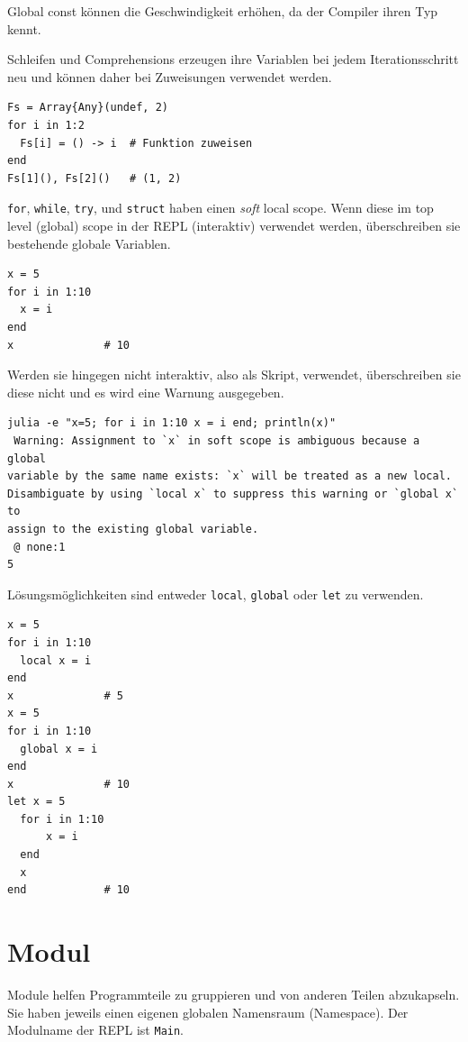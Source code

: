\documentclass[10pt,twocolumn]{scrartcl}
\begin{document}
Global const können die Geschwindigkeit erhöhen, da der Compiler ihren Typ
kennt.

Schleifen und Comprehensions erzeugen ihre Variablen bei jedem Iterationsschritt
neu und können daher bei Zuweisungen verwendet werden.

\begin{lstlisting}
Fs = Array{Any}(undef, 2)
for i in 1:2
  Fs[i] = () -> i  # Funktion zuweisen
end
Fs[1](), Fs[2]()   # (1, 2)
\end{lstlisting}

\lstinline|for|, \lstinline|while|, \lstinline|try|, und \lstinline|struct|
haben einen \emph{soft} local scope. Wenn diese im top level (global) scope in
der REPL (interaktiv) verwendet werden, überschreiben sie bestehende globale
Variablen.

\begin{lstlisting}
x = 5
for i in 1:10
  x = i
end
x              # 10
\end{lstlisting}

Werden sie hingegen nicht interaktiv, also als Skript, verwendet,
überschreiben sie diese nicht und es wird eine Warnung ausgegeben.

\begin{lstlisting}
julia -e "x=5; for i in 1:10 x = i end; println(x)"
 Warning: Assignment to `x` in soft scope is ambiguous because a global
variable by the same name exists: `x` will be treated as a new local.
Disambiguate by using `local x` to suppress this warning or `global x` to
assign to the existing global variable.
 @ none:1
5
\end{lstlisting}

Lösungsmöglichkeiten sind entweder \lstinline|local|, \lstinline|global| oder
\lstinline|let| zu verwenden.

\begin{lstlisting}
x = 5
for i in 1:10
  local x = i
end
x              # 5
x = 5
for i in 1:10
  global x = i
end
x              # 10
let x = 5
  for i in 1:10
      x = i
  end
  x
end            # 10
\end{lstlisting}

\section{Modul}
\label{sec:modul}

Module helfen Programmteile zu gruppieren und von anderen Teilen abzukapseln.
Sie haben jeweils einen eigenen globalen Namensraum (Namespace). Der Modulname
der REPL ist \lstinline|Main|.
\end{document}
